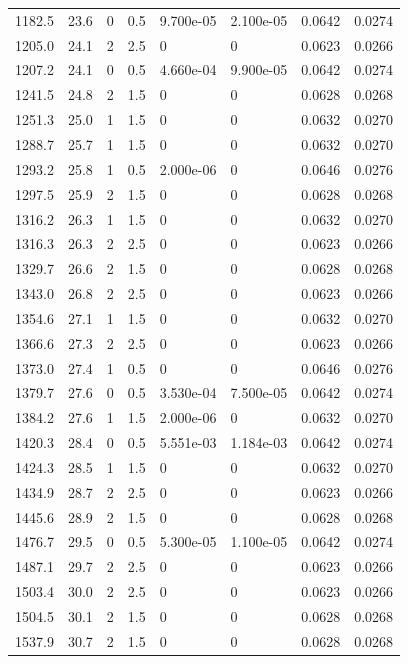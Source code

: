 \documentclass[preview]{standalone}
\begin{document}
{{{\begin{tabular}{L{1.2cm}C{1.2cm} C{0.3cm}C{0.5cm} C{1.4cm}C{1.4cm} C{1.4cm}C{1.4cm}}
  1182.5  &  23.6  & 0     & 0.5 &  9.700e-05  & 2.100e-05  & 0.0642 &  0.0274   \\ 
  1205.0  &  24.1  & 2     & 2.5 &  0  & 0  & 0.0623 &  0.0266   \\ 
  1207.2  &  24.1  & 0     & 0.5 &  4.660e-04  & 9.900e-05  & 0.0642 &  0.0274   \\ 
  1241.5  &  24.8  & 2     & 1.5 &  0  & 0  & 0.0628 &  0.0268   \\ 
  1251.3  &  25.0  & 1     & 1.5 &  0  & 0  & 0.0632 &  0.0270   \\ 
  1288.7  &  25.7  & 1     & 1.5 &  0  & 0  & 0.0632 &  0.0270   \\ 
  1293.2  &  25.8  & 1     & 0.5 &  2.000e-06  & 0  & 0.0646 &  0.0276   \\ 
  1297.5  &  25.9  & 2     & 1.5 &  0  & 0  & 0.0628 &  0.0268   \\ 
  1316.2  &  26.3  & 1     & 1.5 &  0  & 0  & 0.0632 &  0.0270   \\ 
  1316.3  &  26.3  & 2     & 2.5 &  0  & 0  & 0.0623 &  0.0266   \\ 
  1329.7  &  26.6  & 2     & 1.5 &  0  & 0  & 0.0628 &  0.0268   \\ 
  1343.0  &  26.8  & 2     & 2.5 &  0  & 0  & 0.0623 &  0.0266   \\ 
  1354.6  &  27.1  & 1     & 1.5 &  0  & 0  & 0.0632 &  0.0270   \\ 
  1366.6  &  27.3  & 2     & 2.5 &  0  & 0  & 0.0623 &  0.0266   \\ 
  1373.0  &  27.4  & 1     & 0.5 &  0  & 0  & 0.0646 &  0.0276   \\ 
  1379.7  &  27.6  & 0     & 0.5 &  3.530e-04  & 7.500e-05  & 0.0642 &  0.0274   \\ 
  1384.2  &  27.6  & 1     & 1.5 &  2.000e-06  & 0  & 0.0632 &  0.0270   \\ 
  1420.3  &  28.4  & 0     & 0.5 &  5.551e-03  & 1.184e-03  & 0.0642 &  0.0274   \\ 
  1424.3  &  28.5  & 1     & 1.5 &  0  & 0  & 0.0632 &  0.0270   \\ 
  1434.9  &  28.7  & 2     & 2.5 &  0  & 0  & 0.0623 &  0.0266   \\ 
  1445.6  &  28.9  & 2     & 1.5 &  0  & 0  & 0.0628 &  0.0268   \\ 
  1476.7  &  29.5  & 0     & 0.5 &  5.300e-05  & 1.100e-05  & 0.0642 &  0.0274   \\ 
  1487.1  &  29.7  & 2     & 2.5 &  0  & 0  & 0.0623 &  0.0266   \\ 
  1503.4  &  30.0  & 2     & 2.5 &  0  & 0  & 0.0623 &  0.0266   \\ 
  1504.5  &  30.1  & 2     & 1.5 &  0  & 0  & 0.0628 &  0.0268   \\ 
  1537.9  &  30.7  & 2     & 1.5 &  0  & 0  & 0.0628 &  0.0268   \\ 
\hline 
\end{tabular} 

}}}
\end{document}
